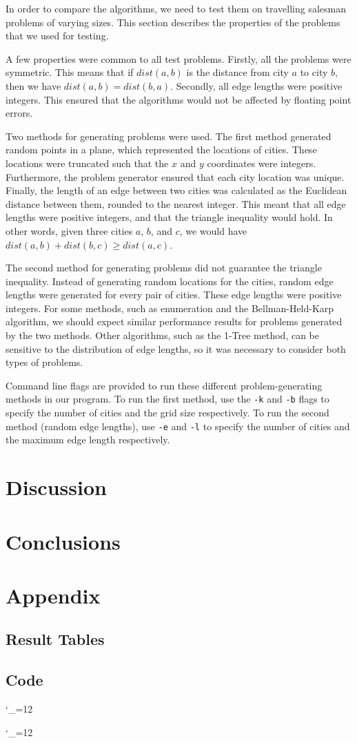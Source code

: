 \documentclass[11pt]{article}
\newcommand{\code}{\begingroup
  \catcode`_=12 \docode}
\newcommand{\docode}[2]{
	\begin{framed}
	\end{framed}\endgroup}
\begin{document}
In order to compare the algorithms, we need to test them on travelling salesman problems of varying sizes. This section describes the properties of the problems that we used for testing.

A few properties were common to all test problems. Firstly, all the problems were symmetric. This means that if $dist(a,b)$ is the distance from city $a$ to city $b$, then we have $dist(a,b) = dist(b,a)$. Secondly, all edge lengths were positive integers. This ensured that the algorithms would not be affected by floating point errors.

Two methods for generating problems were used. The first method generated random points in a plane, which represented the locations of cities. These locations were truncated such that the $x$ and $y$ coordinates were integers. Furthermore, the problem generator ensured that each city location was unique. Finally, the length of an edge between two cities was calculated as the Euclidean distance between them, rounded to the nearest integer. This meant that all edge lengths were positive integers, and that the triangle inequality would hold. In other words, given three cities $a$, $b$, and $c$, we would have $dist(a,b) + dist(b,c) \geq dist(a,c)$.

The second method for generating problems did not guarantee the triangle inequality. Instead of generating random locations for the cities, random edge lengths were generated for every pair of cities. These edge lengths were positive integers. For some methods, such as enumeration and the Bellman-Held-Karp algorithm, we should expect similar performance results for problems generated by the two methods. Other algorithms, such as the 1-Tree method, can be sensitive to the distribution of edge lengths, so it was necessary to consider both types of problems.

Command line flags are provided to run these different problem-generating methods in our program. To run the first method, use the \texttt{-k} and \texttt{-b} flags to specify the number of cities and the grid size respectively. To run the second method (random edge lengths), use \texttt{-e} and \texttt{-l} to specify the number of cities and the maximum edge length respectively.

\section{Discussion}
\label{sec:discussion}

\section{Conclusions}
\label{sec:conclusions}


\nocite{*}



\section*{Appendix}
\subsection*{Result Tables}
\subsection*{Code}
\code{../onetree.h}{C++}
\code{../onetree.cpp}{C++}


\end{document}

